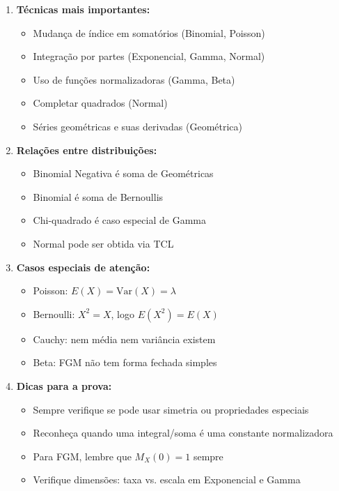 \documentclass[12pt,a4paper]{article}
\theoremstyle{plain}
\theoremstyle{definition}
\theoremstyle{remark}
\begin{document}
\begin{enumerate}
    \item \textbf{Técnicas mais importantes:}
    \begin{itemize}
        \item Mudança de índice em somatórios (Binomial, Poisson)
        \item Integração por partes (Exponencial, Gamma, Normal)
        \item Uso de funções normalizadoras (Gamma, Beta)
        \item Completar quadrados (Normal)
        \item Séries geométricas e suas derivadas (Geométrica)
    \end{itemize}
    
    \item \textbf{Relações entre distribuições:}
    \begin{itemize}
        \item Binomial Negativa é soma de Geométricas
        \item Binomial é soma de Bernoullis
        \item Chi-quadrado é caso especial de Gamma
        \item Normal pode ser obtida via TCL
    \end{itemize}
    
    \item \textbf{Casos especiais de atenção:}
    \begin{itemize}
        \item Poisson: \(E(X) = \text{Var}(X) = \lambda\)
        \item Bernoulli: \(X^2 = X\), logo \(E(X^2) = E(X)\)
        \item Cauchy: nem média nem variância existem
        \item Beta: FGM não tem forma fechada simples
    \end{itemize}
    
    \item \textbf{Dicas para a prova:}
    \begin{itemize}
        \item Sempre verifique se pode usar simetria ou propriedades especiais
        \item Reconheça quando uma integral/soma é uma constante normalizadora
        \item Para FGM, lembre que \(M_X(0) = 1\) sempre
        \item Verifique dimensões: taxa vs. escala em Exponencial e Gamma
    \end{itemize}
\end{enumerate}
\end{document}
